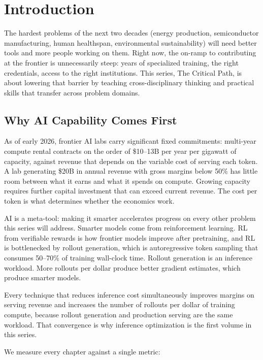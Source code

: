 \section*{Introduction}

The hardest problems of the next two decades (energy production, semiconductor manufacturing, human healthspan, environmental sustainability) will need better tools and more people working on them. Right now, the on-ramp to contributing at the frontier is unnecessarily steep: years of specialized training, the right credentials, access to the right institutions. This series, The Critical Path, is about lowering that barrier by teaching cross-disciplinary thinking and practical skills that transfer across problem domains.

\subsection*{Why AI Capability Comes First}

As of early 2026, frontier AI labs carry significant fixed commitments: multi-year compute rental contracts on the order of \$10--13B per year per gigawatt of capacity, against revenue that depends on the variable cost of serving each token. A lab generating \$20B in annual revenue with gross margins below 50\% has little room between what it earns and what it spends on compute. Growing capacity requires further capital investment that can exceed current revenue. The cost per token is what determines whether the economics work.

AI is a meta-tool: making it smarter accelerates progress on every other problem this series will address. Smarter models come from reinforcement learning. RL from verifiable rewards is how frontier models improve after pretraining, and RL is bottlenecked by rollout generation, which is autoregressive token sampling that consumes 50--70\% of training wall-clock time. Rollout generation is an inference workload. More rollouts per dollar produce better gradient estimates, which produce smarter models.

Every technique that reduces inference cost simultaneously improves margins on serving revenue and increases the number of rollouts per dollar of training compute, because rollout generation and production serving are the same workload. That convergence is why inference optimization is the first volume in this series.

We measure every chapter against a single metric:

